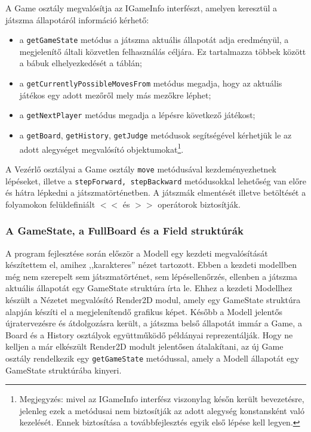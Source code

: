 \documentclass[12pt, twoside]{report}
\begin{document}
A Game osztály megvalósítja az IGameInfo interfészt, amelyen keresztül a játszma állapotáról információ kérhető:
\begin{itemize}
	\item a {\tt getGameState} metódus a játszma aktuális állapotát adja eredményül, a megjelenítő általi közvetlen felhasználás céljára. Ez tartalmazza többek között a bábuk elhelyezkedését a táblán;
	\item a {\tt getCurrentlyPossibleMovesFrom} metódus megadja, hogy az aktuális játékos egy adott mezőről mely más mezőkre léphet;
	\item a {\tt getNextPlayer} metódus megadja a lépésre következő játékost;
	\item a {\tt getBoard}, {\tt getHistory}, {\tt getJudge} metódusok segítségével kérhetjük le az adott alegységet megvalósító objektumokat\footnote{Megjegyzés: mivel az IGameInfo interfész viszonylag későn került bevezetésre, jelenleg ezek a metódusai nem biztosítják az adott alegység konstansként való kezelését. Ennek biztosítása a továbbfejlesztés egyik első lépése kell legyen.}.
\end{itemize}

A Vezérlő osztályai a Game osztály {\tt move} metódusával kezdeményezhetnek lépéseket, illetve a {\tt stepForward, stepBackward} metódusokkal lehetőség van előre és hátra lépkedni a játszmatörténetben. A játszmák elmentését illetve betöltését a folyamokon felüldefiniált $<<$ és $>>$ operátorok biztosítják.

\subsubsection{A GameState, a FullBoard és a Field struktúrák}

A program fejlesztése során először a Modell egy kezdeti megvalósítását készítettem el, amihez ,,karakteres'' nézet tartozott. Ebben a kezdeti modellben még nem szerepelt sem játszmatörténet, sem lépésellenőrzés, ellenben a játszma aktuális állapotát egy GameState struktúra írta le. Ehhez a kezdeti Modellhez készült a Nézetet megvalósító Render2D modul, amely egy GameState struktúra alapján készíti el a megjelenítendő grafikus képet. Később a Modell jelentős újratervezésre és átdolgozásra került, a játszma belső állapotát immár a Game, a Board és a History osztályok együttműködő példányai reprezentálják. Hogy ne kelljen a már elkészült Render2D modult jelentősen átalakítani, az új Game osztály rendelkezik egy {\tt getGameState} metódussal, amely a Modell állapotát egy GameState struktúrába kinyeri.
\end{document}
